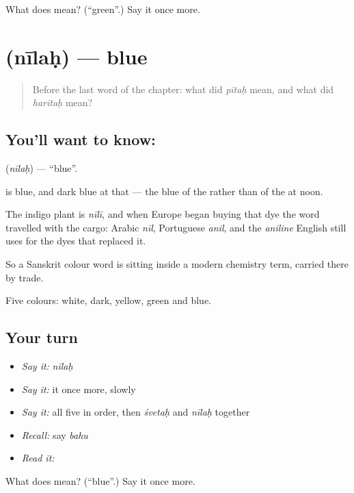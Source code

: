 \begin{tcolorbox}[breakable,colback=teal!4,colframe=teal!35!black,title={Before you move on}]
What does  mean? (\textquotedblleft{}green\textquotedblright{}.) Say it once more.
\end{tcolorbox}
\section[\texorpdfstring{\sk{नीलः} (nīlaḥ)}{नीलः (nīlaḥ)}]{ (nīlaḥ) — blue}

\label{lesson:SA-C44-blue}



\begin{quote}
Before the last word of the chapter: what did \emph{pītaḥ} mean, and what did \emph{haritaḥ} mean?
\end{quote}

\subsection*{You'll want to know: }
\textbf{} (\emph{nīlaḥ}) — \textquotedblleft{}blue\textquotedblright{}.

\textbf{} is blue, and dark blue at that — the blue of the  rather than of the  at noon.

The indigo plant is \emph{nīlī}, and when Europe began buying that dye the word travelled with the cargo: Arabic \emph{nīl}, Portuguese \emph{anil}, and the \emph{aniline} English still uses for the dyes that replaced it.

So a Sanskrit colour word is sitting inside a modern chemistry term, carried there by trade.

\begin{grammarlens}[title={What you've built}]
Five colours: white, dark, yellow, green and blue.
\end{grammarlens}

\subsection*{Your turn}
\begin{itemize}
\raggedright
  \item \emph{Say it:} \emph{nīlaḥ}
  \item \emph{Say it:} it once more, slowly
  \item \emph{Say it:} all five in order, then \emph{śvetaḥ} and \emph{nīlaḥ} together
  \item \emph{Recall:} say \emph{bahu}
  \item \emph{Read it:} \textbf{}
\end{itemize}

\begin{tcolorbox}[breakable,colback=teal!4,colframe=teal!35!black,title={Before you move on}]
What does  mean? (\textquotedblleft{}blue\textquotedblright{}.) Say it once more.
\end{tcolorbox}
